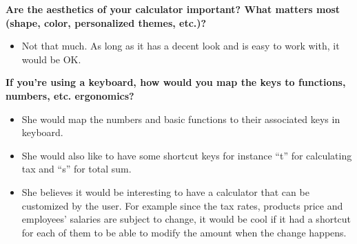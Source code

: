 \documentclass{article}
\begin{document}
\textbf{Are the aesthetics of your calculator important? What matters most (shape, color,  personalized themes, etc.)?}
\begin{itemize}
\itemsep0em 
\item Not that much. As long as it has a decent look and is easy to work with, it would be OK.
\end{itemize}

\textbf{If you’re using a keyboard, how would you map the keys to functions, numbers, etc. ergonomics?}
\begin{itemize}
\itemsep0em 
\item She would map the numbers and basic functions to their associated keys in keyboard.
\item She would also like to have some shortcut keys for instance “t” for calculating tax and “s” for total sum.
\item She believes it would be interesting to have a calculator that can be customized by the user. For example since the tax rates, products price and employees' salaries are subject to change, it would be cool if it had a shortcut for each of them to be able to modify the amount when the change happens. 
\end{itemize}
\pagebreak
\end{document}
